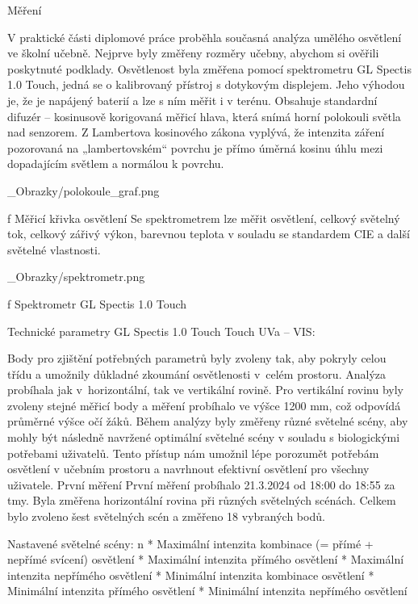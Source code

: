 \chap Měření

V praktické části diplomové práce proběhla současná analýza umělého osvětlení ve školní učebně. Nejprve byly změřeny rozměry učebny, abychom si ověřili poskytnuté podklady. Osvětlenost byla změřena pomocí spektrometru {\sbf GL Spectis 1.0 Touch}, jedná se o kalibrovaný přístroj s dotykovým displejem. Jeho výhodou je, že je napájený baterií a lze s ním měřit i v terénu. Obsahuje standardní difuzér – kosinusově korigovaná měřicí hlava, která snímá horní polokouli světla nad senzorem. Z Lambertova kosinového zákona vyplývá, že intenzita záření pozorovaná na „lambertovském“ povrchu je přímo úměrná kosinu úhlu mezi dopadajícím světlem a normálou k povrchu.

\medskip {}
\picw=8cm _Obrazky/polokoule_graf.png
\caption/f Měřicí křivka osvětlení
\medskip
Se spektrometrem lze měřit osvětlení, celkový světelný tok, celkový zářivý výkon, barevnou teplota v souladu se standardem CIE a další světelné vlastnosti.

\medskip {}
\picw=5cm _Obrazky/spektrometr.png
\caption/f Spektrometr GL Spectis 1.0 Touch
\medskip

\medskip
{\sbf Technické parametry GL Spectis 1.0 Touch Touch UVa – VIS:}
\medskip
{}

\medskip
Body pro zjištění potřebných parametrů byly zvoleny tak, aby pokryly celou třídu a umožnily důkladné zkoumání osvětlenosti v~celém prostoru. Analýza probíhala jak v~horizontální, tak ve vertikální rovině. Pro vertikální rovinu byly zvoleny stejné měřicí body a měření probíhalo ve výšce 1200 mm, což odpovídá průměrné výšce očí žáků.
\medskip
Během analýzy byly změřeny různé světelné scény, aby mohly být následně navržené optimální světelné scény v souladu s biologickými potřebami uživatelů. Tento přístup nám umožnil lépe porozumět potřebám osvětlení v učebním prostoru a navrhnout efektivní osvětlení pro všechny uživatele.
\medskip
\sec První měření
První měření probíhalo 21.3.2024 od 18:00 do 18:55 za tmy. Byla změřena horizontální rovina při různých světelných scénách. Celkem bylo zvoleno šest světelných scén a změřeno 18 vybraných bodů.
\medskip

{\sbf Nastavené světelné scény:}
\medskip
\begitems \style n
    * Maximální intenzita kombinace (= přímé + nepřímé svícení) osvětlení
    * Maximální intenzita přímého osvětlení
    * Maximální intenzita nepřímého osvětlení
    * Minimální intenzita kombinace osvětlení
    * Minimální intenzita přímého osvětlení
    * Minimální intenzita nepřímého osvětlení
\enditems

